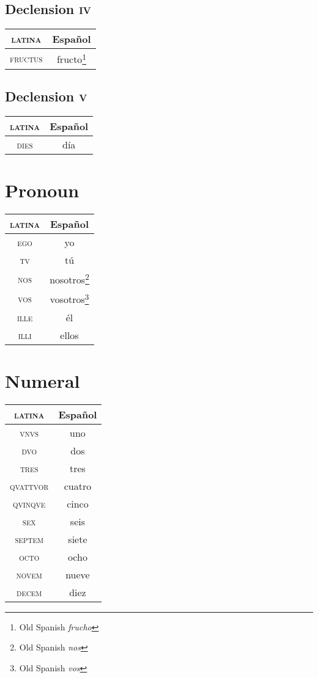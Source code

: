 \documentclass{report}
\begin{document}
\subsection{Declension \textsc{iv}}

\begin{tabular}{|c|c|}
  \hline
  \textsc{latina} & Español \\
  \hline
  \textsc{fructus} & fructo\footnote{Old Spanish \emph{frucho}} \\
  \hline
\end{tabular}

\subsection{Declension \textsc{v}}

\begin{tabular}{|c|c|}
  \hline
  \textsc{latina} & Español \\
  \hline
  \textsc{dies} & día \\
  \hline
\end{tabular}

\section{Pronoun}

\begin{tabular}{|c|c|}
  \hline
  \textsc{latina} & Español \\
  \hline
  \textsc{ego} & yo \\
  \hline
  \textsc{tv} & tú \\
  \hline
  \textsc{nos} & nosotros\footnote{Old Spanish \emph{nos}} \\
  \hline
  \textsc{vos} & vosotros\footnote{Old Spanish \emph{vos}} \\
  \hline
  \textsc{ille} & él \\
  \hline
  \textsc{illi} & ellos \\
  \hline
\end{tabular}

\section{Numeral}

\begin{tabular}{|c|c|}
  \hline
  \textsc{latina} & Español \\
  \hline
  \textsc{vnvs} & uno \\
  \hline
  \textsc{dvo} & dos \\
  \hline
  \textsc{tres} & tres \\
  \hline
  \textsc{qvattvor} & cuatro \\
  \hline
  \textsc{qvinqve} & cinco \\
  \hline
  \textsc{sex} & seis \\
  \hline
  \textsc{septem} & siete \\
  \hline
  \textsc{octo} & ocho \\
  \hline
  \textsc{novem} & nueve \\
  \hline
  \textsc{decem} & diez \\
  \hline
\end{tabular}
\end{document}
